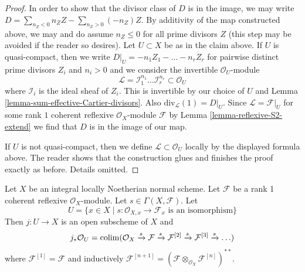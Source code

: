 \begin{proof}
\medskip\noindent
In order to show that the divisor class of $D$ is in the image,
we may write $D = \sum_{n_Z < 0} n_Z Z - \sum_{n_Z > 0} (-n_Z) Z$.
By additivity of the map constructed above, we
may and do assume $n_Z \leq 0$ for all prime divisors $Z$
(this step may be avoided if the reader so desires).
Let $U \subset X$ be as in the claim above. If $U$ is quasi-compact,
then we write $D|_U = -n_1 Z_1 - \ldots - n_r Z_r$ for
pairwise distinct prime divisors $Z_i$ and $n_i > 0$ and
we consider the invertible $\mathcal{O}_U$-module
$$
\mathcal{L} =
\mathcal{I}_1^{n_1} \ldots \mathcal{I}_r^{n_r} \subset \mathcal{O}_U
$$
where $\mathcal{I}_i$ is the ideal sheaf of $Z_i$.
This is invertible by our choice of $U$ and
Lemma \ref{lemma-sum-effective-Cartier-divisors}.
Also $\text{div}_\mathcal{L}(1) = D|_U$.
Since $\mathcal{L} = \mathcal{F}|_U$ for some rank $1$ coherent
reflexive $\mathcal{O}_X$-module $\mathcal{F}$ by
Lemma \ref{lemma-reflexive-S2-extend} we find that $D$ is
in the image of our map.

\medskip\noindent
If $U$ is not quasi-compact, then we define
$\mathcal{L} \subset \mathcal{O}_U$ locally by the displayed formula
above. The reader shows that the construction glues and
finishes the proof exactly as before. Details omitted.
\end{proof}

\begin{lemma}
\label{lemma-structure-sheaf-Xs}
Let $X$ be an integral locally Noetherian normal scheme.
Let $\mathcal{F}$ be a rank 1 coherent reflexive $\mathcal{O}_X$-module.
Let $s \in \Gamma(X, \mathcal{F})$. Let
$$
U = \{x \in X \mid s : \mathcal{O}_{X, x} \to \mathcal{F}_x
\text{ is an isomorphism}\}
$$
Then $j : U \to X$ is an open subscheme of $X$ and
$$
j_*\mathcal{O}_U =
\mathop{\mathrm{colim}}\nolimits (\mathcal{O}_X \xrightarrow{s} \mathcal{F}
\xrightarrow{s} \mathcal{F}^{[2]}
\xrightarrow{s} \mathcal{F}^{[3]}
\xrightarrow{s} \ldots)
$$
where $\mathcal{F}^{[1]} = \mathcal{F}$ and
inductively $\mathcal{F}^{[n + 1]} =
(\mathcal{F} \otimes_{\mathcal{O}_X} \mathcal{F}^{[n]})^{**}$.
\end{lemma}

